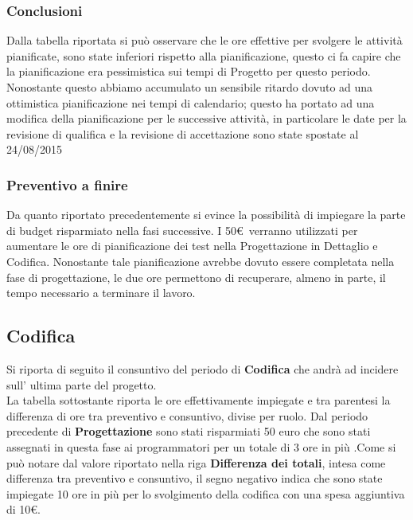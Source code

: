 \subsubsection{Conclusioni}

Dalla tabella riportata si può osservare che le ore effettive per svolgere le attività pianificate, sono state inferiori rispetto alla pianificazione, questo ci fa capire che la pianificazione era pessimistica sui tempi di Progetto per questo periodo.
Nonostante questo abbiamo accumulato un sensibile ritardo dovuto ad una ottimistica pianificazione nei tempi di calendario; questo ha portato ad una modifica della pianificazione per le successive attività, in particolare le date per la revisione di qualifica e la revisione di accettazione sono state spostate al 24/08/2015

\subsubsection{Preventivo a finire}{
	Da quanto riportato precedentemente si evince la possibilità di impiegare la parte di budget risparmiato nella fasi successive. I 50\euro\ verranno utilizzati per aumentare le ore di pianificazione dei test nella Progettazione in Dettaglio e Codifica. Nonostante tale pianificazione avrebbe dovuto essere completata nella fase di progettazione, le due ore permettono di recuperare, almeno in parte, il tempo necessario a terminare il lavoro.
}

\subsection{Codifica}

Si riporta di seguito il consuntivo del periodo di \textbf{Codifica} che andrà ad incidere sull' ultima parte del progetto.\\
La tabella sottostante riporta le ore effettivamente impiegate e tra parentesi la differenza di ore tra preventivo e consuntivo, divise per ruolo. Dal periodo precedente di \textbf{Progettazione} sono stati risparmiati 50 euro che sono stati assegnati in questa fase ai programmatori per un totale di 3 ore in più .Come si può notare dal valore riportato nella riga \textbf{Differenza dei totali}, intesa come differenza tra preventivo e consuntivo, il segno negativo indica che sono state impiegate 10 ore in più per lo svolgimento della codifica con una spesa aggiuntiva di 10\euro.

